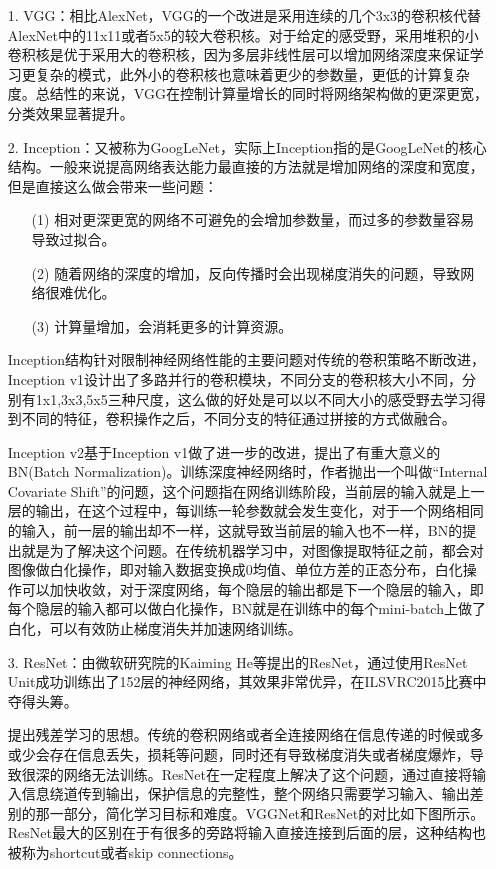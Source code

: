 \begin{itemize}
  \item [1.]VGG：相比AlexNet，VGG的一个改进是采用连续的几个3x3的卷积核代替AlexNet中的11x11或者5x5的较大卷积核。对于给定的感受野，采用堆积的小卷积核是优于采用大的卷积核，因为多层非线性层可以增加网络深度来保证学习更复杂的模式，此外小的卷积核也意味着更少的参数量，更低的计算复杂度。总结性的来说，VGG在控制计算量增长的同时将网络架构做的更深更宽，分类效果显著提升。
\item [2.]Inception：又被称为GoogLeNet，实际上Inception指的是GoogLeNet的核心结构。一般来说提高网络表达能力最直接的方法就是增加网络的深度和宽度，但是直接这么做会带来一些问题：
\begin{itemize}
  \item [(1)]相对更深更宽的网络不可避免的会增加参数量，而过多的参数量容易导致过拟合。
  \item [(2)] 随着网络的深度的增加，反向传播时会出现梯度消失的问题，导致网络很难优化。
  \item [(3)] 计算量增加，会消耗更多的计算资源。
\end{itemize}

Inception结构针对限制神经网络性能的主要问题对传统的卷积策略不断改进，Inception v1设计出了多路并行的卷积模块，不同分支的卷积核大小不同，分别有1x1,3x3,5x5三种尺度，这么做的好处是可以以不同大小的感受野去学习得到不同的特征，卷积操作之后，不同分支的特征通过拼接的方式做融合。

Inception v2\cite{ioffe2015batch}基于Inception v1做了进一步的改进，提出了有重大意义的BN(Batch Normalization)。训练深度神经网络时，作者抛出一个叫做“Internal Covariate Shift”的问题，这个问题指在网络训练阶段，当前层的输入就是上一层的输出，在这个过程中，每训练一轮参数就会发生变化，对于一个网络相同的输入，前一层的输出却不一样，这就导致当前层的输入也不一样，BN的提出就是为了解决这个问题。在传统机器学习中，对图像提取特征之前，都会对图像做白化操作，即对输入数据变换成0均值、单位方差的正态分布，白化操作可以加快收敛，对于深度网络，每个隐层的输出都是下一个隐层的输入，即每个隐层的输入都可以做白化操作，BN就是在训练中的每个mini-batch上做了白化，可以有效防止梯度消失并加速网络训练。

\item [3.]ResNet：由微软研究院的Kaiming He等提出的ResNet，通过使用ResNet Unit成功训练出了152层的神经网络，其效果非常优异，在ILSVRC2015比赛中夺得头筹。

提出残差学习的思想。传统的卷积网络或者全连接网络在信息传递的时候或多或少会存在信息丢失，损耗等问题，同时还有导致梯度消失或者梯度爆炸，导致很深的网络无法训练。ResNet在一定程度上解决了这个问题，通过直接将输入信息绕道传到输出，保护信息的完整性，整个网络只需要学习输入、输出差别的那一部分，简化学习目标和难度。VGGNet和ResNet的对比如下图所示。ResNet最大的区别在于有很多的旁路将输入直接连接到后面的层，这种结构也被称为shortcut或者skip connections。


\end{itemize}
